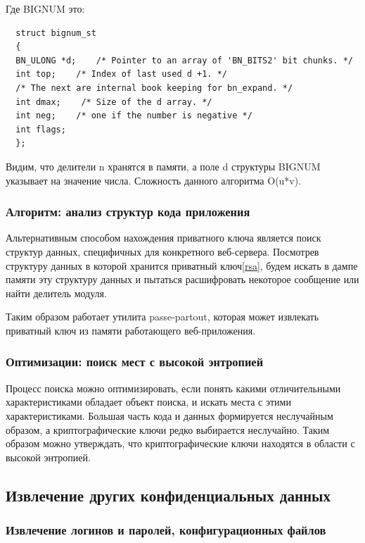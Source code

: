 \documentclass[20pt]{article}
\begin{document}
Где BIGNUM это:
\begin{lstlisting}
  struct bignum_st
  {
  BN_ULONG *d;    /* Pointer to an array of 'BN_BITS2' bit chunks. */
  int top;    /* Index of last used d +1. */
  /* The next are internal book keeping for bn_expand. */
  int dmax;    /* Size of the d array. */
  int neg;    /* one if the number is negative */
  int flags;
  };
\end{lstlisting}

Видим, что делители n хранятся в памяти, а поле d структуры BIGNUM указывает на
значение числа. Сложность данного алгоритма O(u*v).

\subsubsection{Алгоритм: анализ структур кода приложения}

Альтернативным способом нахождения приватного ключа является поиск структур
данных, специфичных для конкретного веб-сервера. Посмотрев структуру данных в которой
хранится приватный ключ\ref{rsa}, будем искать в дампе памяти эту структуру данных
и пытаться расшифровать некоторое сообщение или найти делитель модуля.

Таким образом работает утилита passe-partout\cite{passe-partout}, которая может
извлекать приватный ключ из памяти работающего веб-приложения.

\subsubsection{Оптимизации: поиск мест с высокой энтропией}

Процесс поиска можно оптимизировать, если понять какими отличительными
характеристиками обладает объект поиска, и искать места с этими характеристиками.
Большая часть кода и данных формируется неслучайным образом, а криптографические
ключи редко выбирается неслучайно. Таким образом можно утверждать, что
криптографические ключи находятся в области с высокой энтропией.

\subsection{Извлечение других конфиденциальных данных}

\subsubsection{Извлечение логинов и паролей, конфигурационных файлов}
\end{document}
